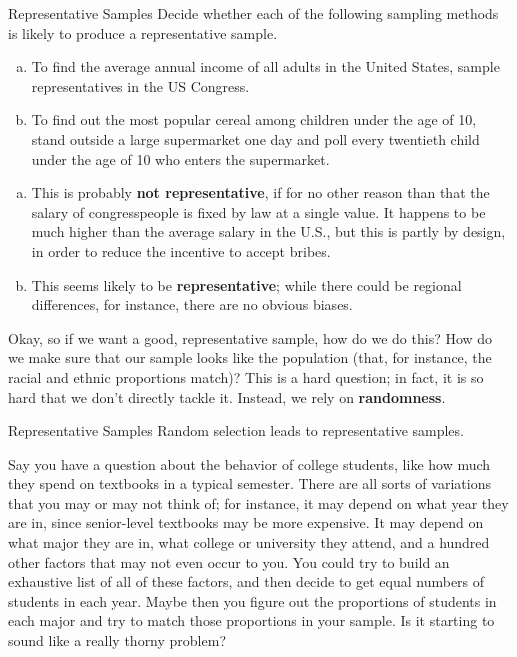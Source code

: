 \begin{example}{Representative Samples}
Decide whether each of the following sampling methods is likely to produce a representative sample.

\begin{enumerate}[(a)]
\item To find the average annual income of all adults in the United States, sample representatives in the US Congress.
\item To find out the most popular cereal among children under the age of 10, stand outside a large supermarket one day and poll every twentieth child under the age of 10 who enters the supermarket.
\end{enumerate}

\sol
\begin{enumerate}[(a)]
\item This is probably \textbf{not representative}, if for no other reason than that the salary of congresspeople is fixed by law at a single value.  It happens to be much higher than the average salary in the U.S., but this is partly by design, in order to reduce the incentive to accept bribes.

\item This seems likely to be \textbf{representative}; while there could be regional differences, for instance, there are no obvious biases.
\end{enumerate}
\end{example}

Okay, so if we want a good, representative sample, how do we do this?  How do we make sure that our sample looks like the population (that, for instance, the racial and ethnic proportions match)?  This is a hard question; in fact, it is so hard that we don't directly tackle it.  Instead, we rely on \textbf{randomness}.

\begin{proc}{Representative Samples}
Random selection leads to representative samples.
\end{proc}

Say you have a question about the behavior of college students, like how much they spend on textbooks in a typical semester.  There are all sorts of variations that you may or may not think of; for instance, it may depend on what year they are in, since senior-level textbooks may be more expensive.  It may depend on what major they are in, what college or university they attend, and a hundred other factors that may not even occur to you.  You could try to build an exhaustive list of all of these factors, and then decide to get equal numbers of students in each year.  Maybe then you figure out the proportions of students in each major and try to match those proportions in your sample.  Is it starting to sound like a really thorny problem?

